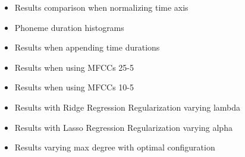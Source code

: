 \begin{itemize}
	\item Results comparison when normalizing time axis
	\item Phoneme duration histograms
	\item Results when appending time durations
	\item Results when using MFCCs 25-5
	\item Results when using MFCCs 10-5
	\item Results with Ridge Regression Regularization varying lambda
	\item Results with Lasso Regression Regularization varying alpha
	\item Results varying max degree with optimal configuration
\end{itemize}